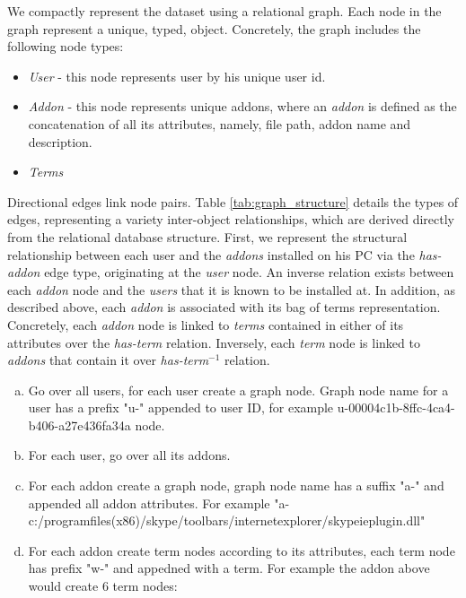 \documentclass[11pt,oneside]{book}
\begin{document}
We compactly represent the dataset using a relational graph. Each node in the graph represent a unique, typed,  object.  Concretely, the graph includes the following node types:
\begin{itemize}
\renewcommand{\labelitemi}{$\bullet$} 
\item {\it User} - this node represents user by his unique user id. 
\item {\it Addon} - this node represents unique addons, where an {\it addon} is defined as the concatenation of all its attributes, namely, file path, addon name and description.
\item {\it Terms} 
\end{itemize}
Directional edges link node pairs.
Table \ref{tab:graph_structure} details the types of edges, representing a variety inter-object relationships, which are derived directly from the relational database structure.
First, we represent the structural relationship between each user and the {\it addons} installed on his PC via the {\it has-addon} edge type, originating at the {\it user} node. An inverse relation exists between each {\it addon} node and the {\it users} that it is known to be installed at. 
In addition, as described above, each {\it addon} is associated with its bag of terms representation. Concretely, each {\it addon} node is linked to {\it terms} contained in either of its attributes over the {\it has-term} relation. Inversely, each {\it term} node is linked to {\it addons} that contain it over {\it has-term$^{-1}$} relation.



\iffalse
\begin{small}
\begin{enumerate}[(a)]
\item Go over all users, for each user create a graph node. Graph node name for a user has a prefix "u-" appended to user ID, for example u-00004c1b-8ffc-4ca4-b406-a27e436fa34a node.

\item For each user, go over all its addons.
\item For each addon create a graph node, graph node name has a suffix "a-" and appended all addon attributes. For example "a-c:/programfiles(x86)/skype/toolbars/internetexplorer/skypeieplugin.dll"
\item For each addon create term nodes according to its attributes, each term node has prefix "w-" and appedned with a term. For example the addon above would create 6 term nodes:
\end{enumerate}
\end{small}
\end{document}
